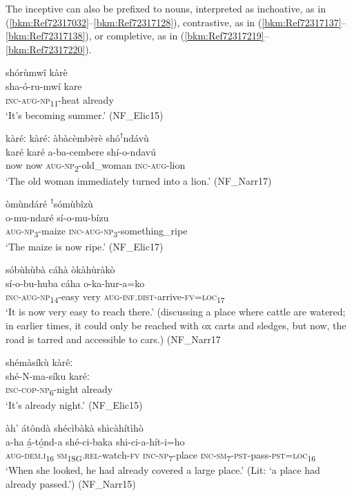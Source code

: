 The inceptive can also be prefixed to nouns, interpreted as inchoative, as in (\ref{bkm:Ref72317032}--\ref{bkm:Ref72317128}), contrastive, as in (\ref{bkm:Ref72317137}--\ref{bkm:Ref72317138}), or completive, as in (\ref{bkm:Ref72317219}--\ref{bkm:Ref72317220}).

\ea
\label{bkm:Ref72317032}
shórùmwî kàrè\\
\gll sha-ó-ru-mwí  kare\\
\textsc{inc}-\textsc{aug}-\textsc{np}\textsubscript{11}-heat  already\\
\glt ‘It’s becoming summer.’ (NF\_Elic15)
\z

\ea
\label{bkm:Ref72317128}
kàréː kàréː àbàcèmbèrè shóꜝndávù\\
\gll karé  karé  a-ba-cembere    shí-o-ndavú\\
now  now  \textsc{aug}-\textsc{np}\textsubscript{2}-old\_woman  \textsc{inc}-\textsc{aug}-lion\\
\glt ‘The old woman immediately turned into a lion.’ (NF\_Narr17)
\z

\ea
\label{bkm:Ref72317137}
òmùndáré ꜝsómùbîzù\\
\gll o-mu-ndaré    sí-o-mu-bízu\\
\textsc{aug}-\textsc{np}\textsubscript{3}-maize  \textsc{inc}-\textsc{aug}-\textsc{np}\textsubscript{3}-something\_ripe\\
\glt ‘The maize is now ripe.’ (NF\_Elic17)
\z

\ea
\label{bkm:Ref72317138}
sóbùhùbà cáhà òkàhùràkò\\
\gll sí-o-bu-huba  cáha  o-ka-hur-a=ko\\
\textsc{inc}-\textsc{aug}-\textsc{np}\textsubscript{14}-easy  very  \textsc{aug}-\textsc{inf}.\textsc{dist}-arrive-\textsc{fv}=\textsc{loc}\textsubscript{17}\\
\glt ‘It is now very easy to reach there.’ (discussing a place where cattle are watered; in earlier times, it could only be reached with ox carts and sledges, but now, the road is tarred and accessible to cars.) (NF\_Narr17
\z

\ea
\label{bkm:Ref72317219}
shémàsíkù kàrêː\\
\gll shé-N-ma-síku  karéː\\
\textsc{inc}-\textsc{cop}-\textsc{np}\textsubscript{6}-night  already\\
\glt ‘It’s already night.’ (NF\_Elic15)
\z

\ea
\label{bkm:Ref72317220}
àh’ átôndà shécìbàkà shìcàhítìhò\\
\gll a-ha    á̲-tó̲nd-a shé-ci-baka    shi-ci-a-hít-i=ho\\
\textsc{aug}-\textsc{dem}.\textsc{i}\textsubscript{16}  \textsc{sm}\textsubscript{1SG}.\textsc{rel}-watch-\textsc{fv}
\textsc{inc}-\textsc{np}\textsubscript{7}-place  \textsc{inc}-\textsc{sm}\textsubscript{7}-\textsc{pst}-pass-\textsc{pst}=\textsc{loc}\textsubscript{16}\\
\glt ‘When she looked, he had already covered a large place.’ (Lit: ‘a place had already passed.’) (NF\_Narr15)
\z

